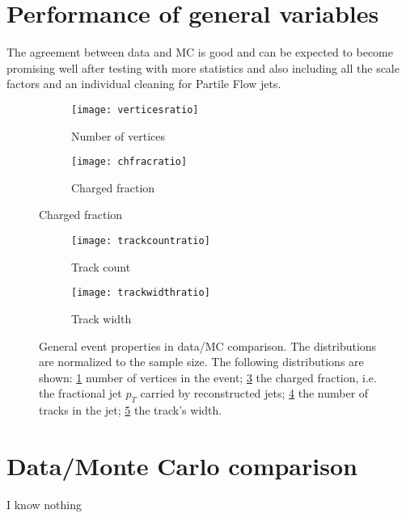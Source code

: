 \section{Performance of general variables}


The agreement between data and MC is good and can be expected to become promising well after testing with more statistics and also including all the scale factors and an individual cleaning for Partile Flow jets.

\begin{figure}[h]
\centering
\begin{subfigure}[b]{0.5\figwidth}
\texttt{[image: verticesratio]}
\caption[Number of vertices]{Number of vertices}
\label{fig:vertices}
\end{subfigure}
\quad
\begin{subfigure}[b]{0.5\figwidth}
\texttt{[image: chfracratio]}
\caption[Charged fraction]{Charged fraction}
\label{fig:chfrac}
\end{subfigure}
\end{figure}


\begin{figure}[h]
\centering
\begin{subfigure}[b]{0.5\figwidth}
\texttt{[image: trackcountratio]}
\caption[Track count]{Track count}
\label{fig:trackcount}
\end{subfigure}
\quad
\begin{subfigure}[b]{0.5\figwidth}
\texttt{[image: trackwidthratio]}
\caption[trackwidth]{Track width}
\label{fig:trackwidth}
\end{subfigure}
\caption{General event properties in data/MC comparison. The distributions are normalized to the sample size. The following distributions are shown: \ref{fig:vertices} number of vertices in the event; \ref{fig:chfrac} the charged fraction, i.e. the fractional jet $p_T$ carried by reconstructed jets; \ref{fig:trackcount} the number of tracks in the jet; \ref{fig:trackwidth} the track's width.}
\label{fig:generalproperties}
\end{figure}


\section{Data/Monte Carlo comparison}
\label{results}

I know nothing